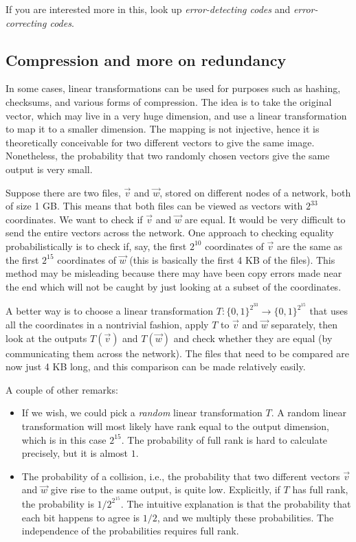 \documentclass[10pt]{amsart}
\begin{document}
If you are interested more in this, look up {\em error-detecting
  codes} and {\em error-correcting codes}.

\subsection{Compression and more on redundancy}

In some cases, linear transformations can be used for purposes such as
hashing, checksums, and various forms of compression. The idea is to
take the original vector, which may live in a very huge dimension, and
use a linear transformation to map it to a smaller dimension. The
mapping is not injective, hence it is theoretically conceivable for
two different vectors to give the same image. Nonetheless, the
probability that two randomly chosen vectors give the same output is
very small.

Suppose there are two files, $\vec{v}$ and $\vec{w}$, stored on
different nodes of a network, both of size 1 GB. This means that both
files can be viewed as vectors with $2^{33}$ coordinates. We want to
check if $\vec{v}$ and $\vec{w}$ are equal. It would be very difficult
to send the entire vectors across the network. One approach to
checking equality probabilistically is to check if, say, the first
$2^{10}$ coordinates of $\vec{v}$ are the same as the first $2^{15}$
coordinates of $\vec{w}$ (this is basically the first 4 KB of the
files). This method may be misleading because there may have been copy
errors made near the end which will not be caught by just looking at a
subset of the coordinates.

A better way is to choose a linear transformation $T: \{ 0,1\}^{2^{33}}
\to \{ 0,1 \}^{2^{15}}$ that uses all the coordinates in a nontrivial
fashion, apply $T$ to $\vec{v}$ and $\vec{w}$ separately, then look at
the outputs $T(\vec{v})$ and $T(\vec{w})$ and check whether they are
equal (by communicating them across the network). The files that need
to be compared are now just 4 KB long, and this comparison can be made
relatively easily.

A couple of other remarks:

\begin{itemize}
\item If we wish, we could pick a {\em random} linear transformation
  $T$. A random linear transformation will most likely have rank equal
  to the output dimension, which is in this case $2^{15}$. The
  probability of full rank is hard to calculate precisely, but it is
  almost $1$.
\item The probability of a collision, i.e., the probability that two
  different vectors $\vec{v}$ and $\vec{w}$ give rise to the same
  output, is quite low. Explicitly, if $T$ has full rank, the
  probability is $1/2^{2^{15}}$. The intuitive explanation is that the
  probability that each bit happens to agree is $1/2$, and we multiply
  these probabilities. The independence of the probabilities requires
  full rank.
\end{itemize}
\end{document}
